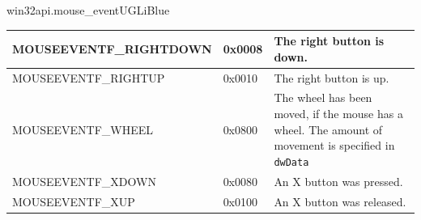\documentclass[a4paper,10pt,cours,firamath]{nsi}
\begin{document}
\begin{encadrecolore}{win32api.mouse\_event}{UGLiBlue}
\begin{center}
\begin{tabularx}{\textwidth}{|l|l|X|}
			MOUSEEVENTF\_RIGHTDOWN      & 
			0x0008                      & 
			The right button is down.                                                                                                                                                                                                                                                                                                                                                                                                                                                                                 \\\hline
			MOUSEEVENTF\_RIGHTUP        & 
			0x0010                      & 
			The right button is up.                                                                                                                                                                                                                                                                                                                                                                                                                                                                                   \\\hline
			MOUSEEVENTF\_WHEEL          & 
			0x0800                      & 
			The wheel has been moved, if the mouse has a wheel. The amount of movement is specified in \texttt{dwData}                                                                                                                                                                                                                                                                                                                                                                                    \\\hline
			MOUSEEVENTF\_XDOWN          & 
			0x0080                      & 
			An X button was pressed.                                                                                                                                                                                                                                                                                                                                                                                                                                                                                  \\\hline
			MOUSEEVENTF\_XUP            & 
			0x0100                      & 
			An X button was released.                                                                                                                                                                                                                                                                                                                                                                                                                                                                                 \\\hline

\end{tabularx}
\end{center}
\end{encadrecolore}
\end{document}
